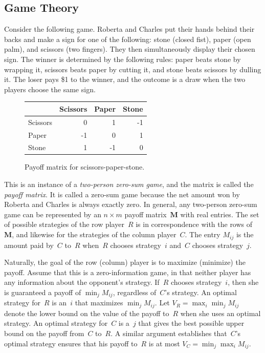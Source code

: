 \documentclass[twoside,12pt]{book}
\theoremstyle{plain}
\theoremstyle{definition}
\theoremstyle{remark}
\begin{document}
\subsection{Game Theory}

Consider the following game.  Roberta and Charles put their hands behind
their backs and make a sign for one of the following: stone (closed fist),
paper (open palm), and scissors (two fingers).  They then simultaneously
display their chosen sign.  The winner is determined by the following rules:
paper beats stone by wrapping it, scissors beats paper by cutting it, and
stone beats scissors by dulling it.  The loser pays \$1 to the winner, and
the outcome is a draw when the two players choose the same sign.

\begin{figure}[htbp]
\centering
\begin{tabular}{l|rrr}
         & Scissors & Paper  & Stone \\ \hline
Scissors &    0     &   1    &  -1   \\
Paper    &   -1     &   0    &   1   \\
Stone    &    1     &  -1    &   0   \\
\end{tabular}
\caption{Payoff matrix for scissors-paper-stone.}
\label{fig:payoff}
\end{figure}

This is an instance of a \emph{two-person zero-sum game}, and the matrix is
called the \emph{payoff matrix}.  It is called a zero-sum game because the
net amount won by Roberta and Charles is always exactly zero.  In general,
any two-person zero-sum game can be represented by an $n\times m$ payoff
matrix~$\mathbf{M}$ with real entries.  The set of possible strategies of the
row player~$R$ is in correspondence with the rows of~$\mathbf{M}$, and
likewise for the strategies of the column player~$C$.  The entry $M_{ij}$ is
the amount paid by~$C$ to~$R$ when~$R$ chooses strategy~$i$ and~$C$ chooses
strategy~$j$.

Naturally, the goal of the row (column) player is to maximize (minimize) the
payoff.  Assume that this is a zero-information game, in that neither player
has any information about the opponent's strategy.  If~$R$ chooses strategy~$i$,
then she is guaranteed a payoff of $\min_j M_{ij}$, regardless of~$C$'s
strategy.  An optimal strategy for~$R$ is an~$i$ that maximizes
$\min_j M_{ij}$.  Let $V_R = \max_i \min_j M_{ij}$ denote the lower bound
on the value of the payoff to~$R$ when she uses an optimal strategy.  An
optimal strategy for~$C$ is a~$j$ that gives the best possible upper bound on
the payoff from~$C$ to~$R$.  A similar argument establishes that~$C$'s
optimal strategy ensures that his payoff to~$R$ is at most
$V_C = \min_j \max_i M_{ij}$.
\end{document}
